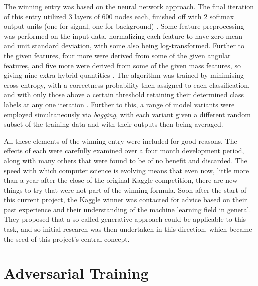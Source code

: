 \documentclass{article} %
\begin{document}
The winning entry was based on the neural network approach. The final iteration of this entry utilized 3 layers of 600 nodes each, finished off with 2 softmax output units (one for signal, one for background) \cite{Melis2015}. Some feature preprocessing was performed on the input data, normalizing each feature to have zero mean and unit standard deviation, with some also being log-transformed. Further to the given features, four more were derived from some of the given angular features, and five more were derived from some of the given mass features, so giving nine extra hybrid quantities \cite{Melis2015}. The algorithm was trained by minimising cross-entropy, with a correctness probability then assigned to each classification, and with only those above a certain threshold retaining their determined class labels at any one iteration \cite{Melis2015}. Further to this, a range of model variants were employed simultaneously via \textit{bagging}, with each variant given a different random subset of the training data and with their outputs then being averaged.

All these elements of the winning entry were included for good reasons. The effects of each were carefully examined over a four month development period, along with many others that were found to be of no benefit and discarded. The speed with which computer science is evolving means that even now, little more than a year after the close of the original Kaggle competition, there are new things to try that were not part of the winning formula. Soon after the start of this current project, the Kaggle winner was contacted for advice based on their past experience and their understanding of the machine learning field in general. They proposed that a so-called generative approach could be applicable to this task, and so initial research was then undertaken in this direction, which became the seed of this project's central concept.


\section{Adversarial Training}
\label{sec:adversarial_training}
\end{document}

